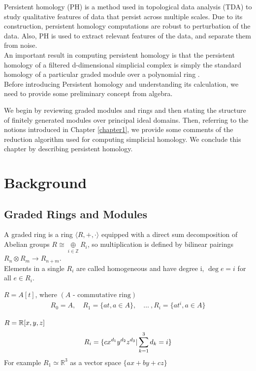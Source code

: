 \documentclass[11pt,a4paper]{report}
\begin{document}
                Persistent homology (PH) is a method used in topological data analysis (TDA) to study
                qualitative features of data that persist across multiple scales. Due to its construction, persistent homology computations are
                robust to perturbation of the data. Also, PH is used to extract relevant features of the data, and separate them from noise. \\

                An important result in computing persistent homology is that the persistent homology of a filtered d-dimensional simplicial
                complex is simply the standard homology of a particular graded module over a polynomial ring \cite{Zomorodian_Carlsson_2005}.\\
                Before introducing Persistent homology and understanding its calculation, we need to provide some preliminary concept from algebra.

                We begin by reviewing graded modules and rings and then stating the structure of finitely generated modules over principal
                ideal domains. Then, referring to the notions introduced in Chapter \ref{chapter1}, we provide some
                comments of the reduction algorithm used for computing simplicial homology. We conclude this chapter by describing persistent
                homology.


                \section{Background}
              \subsection{Graded Rings and Modules}

              A graded ring is a ring $\langle R, +, \cdot \rangle$ equipped with a direct sum decomposition of Abelian
              groups $R \cong \underset{i \in \mathbb{Z}}{\oplus} R_i$, so multiplication is defined by bilinear pairings $R_n \otimes R_m \rightarrow R_{n+m}$. \\

              Elements in a single $R_i$ are called homogeneous and have degree i, $\deg e = i$ for all $e \in R_i$.

              \begin{Ex}
                $ R = A[t]$, where  $(A \textrm{ - commutative ring})$
              \begin{align*}
                R_0 = A, \quad R_1 = \{at, a \in A\}, \quad \dots \ , R_i = \{at^i, a \in A\}
              \end{align*}
              \end{Ex}
              \begin{Ex}
                $R = \mathbb{R}[x,y,z]$
                \[
                R_i = \{cx^{d_{1}}y^{d_{2}}z^{d_{3}} | \sum^3_{k=1}d_k = i\}\\
                \]
              For example $R_1 \simeq \mathbb{R}^3$ as a vector space $\{ax + by + cz\}$\\
              \end{Ex}
\end{document}

